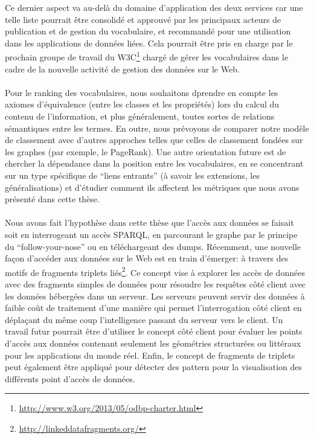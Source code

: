 \documentclass[a4paper,11pt,twoside]{report}
\begin{document}
Ce dernier aspect va au-delà du domaine d'application des deux services car une telle liste pourrait être consolidé et approuvé par les principaux acteurs de publication et de gestion du vocabulaire, et recommandé pour une utilisation dans les applications de données liées. Cela pourrait être pris en charge par le prochain groupe de travail du W3C\footnote{\url{http://www.w3.org/2013/05/odbp-charter.html}} chargé de gérer les vocabulaires dans le cadre de la nouvelle activité de gestion des données sur le Web.


\paragraph{}

Pour le ranking des vocabulaires, nous souhaitons dprendre en compte les axiomes d'équivalence (entre les classes et les propriétés) lors du calcul du contenu de l'information, et plus généralement, toutes sortes de relations sémantiques entre les termes. En outre, nous prévoyons de comparer notre modèle de classement avec d'autres approches telles que celles de classement fondées sur les graphes  (par exemple, le PageRank). Une autre orientation future est de chercher la dépendance dans la position entre les vocabulaires, en se concentrant sur un type spécifique de ``liens entrants'' (à savoir les extensions, les généralisations) et d'étudier comment ils affectent les métriques que nous avons présenté dans cette thèse.


\paragraph{}
Nous avons fait l'hypothèse dans cette thèse que l'accès aux données se faisait soit en interrogeant un accès SPARQL, en parcourant le graphe par le principe du ``follow-your-nose'' ou en téléchargeant des dumps. Récemment, une nouvelle façon d'accéder aux données sur le Web est en train d'émerger: à travers  des motifs de fragments triplets liés\footnote{\url{http://linkeddatafragments.org/}}. Ce concept vise à explorer les accès de données avec des fragments simples de données pour résoudre les requêtes côté client avec les données hébergées dans un serveur. Les serveurs peuvent servir des données à faible coût de traitement d'une manière qui permet l'interrogation côté client en déplaçant du même coup l'intelligence passant du serveur vers le client. Un travail futur pourrait être d'utiliser le concept côté client pour évaluer les points d'accès aux données contenant seulement les géométries structurées ou littéraux pour les applications du monde réel. Enfin, le concept de fragments de triplets  peut également être appliqué pour détecter des pattern pour la visualisation des différents point d'accès de données.
\end{document}
